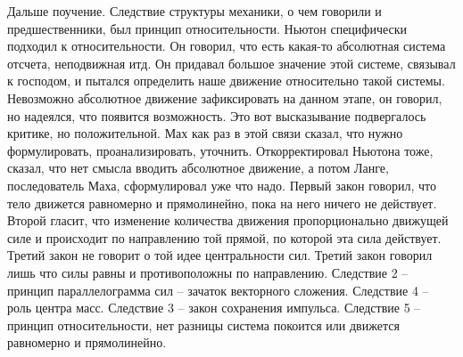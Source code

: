 \documentclass[a4paper, 12pt]{article}
\begin{document}
Дальше поучение. Следствие структуры механики, о чем говорили 
и предшественники, был принцип относительности. Ньютон специфически 
подходил к относительности. Он говорил, что есть какая-то абсолютная 
система отсчета, неподвижная итд. Он придавал большое значение этой 
системе, связывал к господом, и пытался определить наше движение 
относительно такой системы. Невозможно абсолютное движение зафиксировать 
на данном этапе, он говорил, но надеялся, что появится возможность. Это 
вот высказывание подвергалось критике, но положительной. Мах как раз 
в этой связи сказал, что нужно формулировать, проанализировать, 
уточнить. Откорректировал Ньютона тоже, сказал, что нет смысла вводить 
абсолютное движение, а потом Ланге, последователь Маха, сформулировал 
уже что надо. Первый закон говорил, что тело движется равномерно 
и прямолинейно, пока на него ничего не действует. Второй гласит, что 
изменение количества движения пропорционально движущей силе и происходит 
по направлению той прямой, по которой эта сила действует. Третий закон 
не говорит о той идее центральности сил. Третий закон говорил лишь что 
силы равны и противоположны по направлению. Следствие 2 -- принцип 
параллелограмма сил -- зачаток векторного сложения. Следствие 4 -- роль 
центра масс. Следствие 3 -- закон сохранения импульса. Следствие 5 -- 
принцип относительности, нет разницы система покоится или движется 
равномерно и прямолинейно.
\end{document}
